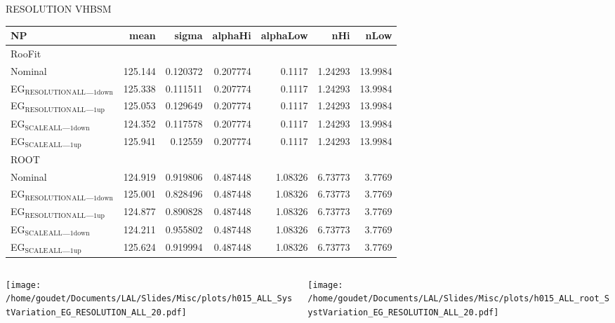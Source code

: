 \documentclass[bigger]{beamer}
\begin{document}
\begin{frame}[label={sec:org4798c9c}]{RESOLUTION VHBSM}
\begin{center}
\tiny
\begin{tabular}{lrrrrrr}
\hline
NP & mean & sigma & alphaHi & alphaLow & nHi & nLow\\
\hline
\hline
RooFit &  &  &  &  &  & \\
\hline
Nominal & 125.144 & 0.120372 & 0.207774 & 0.1117 & 1.24293 & 13.9984\\
EG\(_{\text{RESOLUTION}}\)\(_{\text{ALL}}\)\_\(_{\text{1down}}\) & 125.338 & 0.111511 & 0.207774 & 0.1117 & 1.24293 & 13.9984\\
EG\(_{\text{RESOLUTION}}\)\(_{\text{ALL}}\)\_\(_{\text{1up}}\) & 125.053 & 0.129649 & 0.207774 & 0.1117 & 1.24293 & 13.9984\\
EG\(_{\text{SCALE}}\)\(_{\text{ALL}}\)\_\(_{\text{1down}}\) & 124.352 & 0.117578 & 0.207774 & 0.1117 & 1.24293 & 13.9984\\
EG\(_{\text{SCALE}}\)\(_{\text{ALL}}\)\_\(_{\text{1up}}\) & 125.941 & 0.12559 & 0.207774 & 0.1117 & 1.24293 & 13.9984\\
\hline
\hline
ROOT &  &  &  &  &  & \\
\hline
Nominal & 124.919 & 0.919806 & 0.487448 & 1.08326 & 6.73773 & 3.7769\\
EG\(_{\text{RESOLUTION}}\)\(_{\text{ALL}}\)\_\(_{\text{1down}}\) & 125.001 & 0.828496 & 0.487448 & 1.08326 & 6.73773 & 3.7769\\
EG\(_{\text{RESOLUTION}}\)\(_{\text{ALL}}\)\_\(_{\text{1up}}\) & 124.877 & 0.890828 & 0.487448 & 1.08326 & 6.73773 & 3.7769\\
EG\(_{\text{SCALE}}\)\(_{\text{ALL}}\)\_\(_{\text{1down}}\) & 124.211 & 0.955802 & 0.487448 & 1.08326 & 6.73773 & 3.7769\\
EG\(_{\text{SCALE}}\)\(_{\text{ALL}}\)\_\(_{\text{1up}}\) & 125.624 & 0.919994 & 0.487448 & 1.08326 & 6.73773 & 3.7769\\
\hline
\end{tabular}
\end{center}

\begin{columns}
\begin{column}{0.5\columnwidth}
\begin{center}
\texttt{[image: /home/goudet/Documents/LAL/Slides/Misc/plots/h015\_ALL\_SystVariation\_EG\_RESOLUTION\_ALL\_20.pdf]}
\end{center}
\end{column}

\begin{column}{0.5\columnwidth}
\begin{center}
\texttt{[image: /home/goudet/Documents/LAL/Slides/Misc/plots/h015\_ALL\_root\_SystVariation\_EG\_RESOLUTION\_ALL\_20.pdf]}
\end{center}
\end{column}
\end{columns}
\end{frame}
\end{document}
